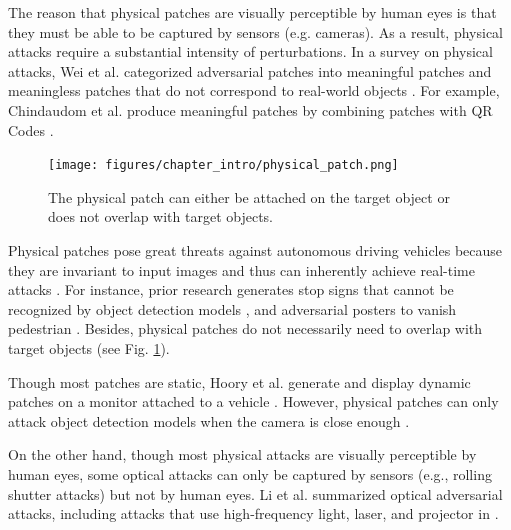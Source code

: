The reason that physical patches are visually perceptible by human eyes is that they must be able to be captured by sensors (e.g. cameras). As a result, physical attacks require a substantial intensity of perturbations. In a survey on physical attacks, Wei et al. categorized adversarial patches into meaningful patches and meaningless patches that do not correspond to real-world objects \citep{wei2023visually}. For example, Chindaudom et al. produce meaningful patches by combining patches with QR Codes \citep{chindaudom2020adversarialqr, chindaudom2022surreptitious}. 

\begin{figure}[H]
\centering
\texttt{[image: figures/chapter\_intro/physical\_patch.png]}
\caption{The physical patch can either be attached on the target object or does not overlap with target objects.}
\label{fig.physical_patch_overlap}
\end{figure}

Physical patches pose great threats against autonomous driving vehicles because they are invariant to input images and thus can inherently achieve real-time attacks \citep{threet2021physical}. For instance, prior research generates stop signs that cannot be recognized by object detection models \citep{song2018physical} \citep{chen2019shapeshifter}, and adversarial posters to vanish pedestrian \citep{thys2019fooling, wang2021towards}. Besides, physical patches do not necessarily need to overlap with target objects (see Fig. \ref{fig.physical_patch_overlap}).

Though most patches are static, Hoory et al. generate and display dynamic patches on a monitor attached to a vehicle \citep{hoory2020dynamic}. However, physical patches can only attack object detection models when the camera is close enough \citep{wang2021daedalus, lu2021scale}.

On the other hand, though most physical attacks are visually perceptible by human eyes, some optical attacks can only be captured by sensors (e.g., rolling shutter attacks) but not by human eyes. Li et al. summarized optical adversarial attacks, including attacks that use high-frequency light, laser, and projector in \citep{li2022survey}.


